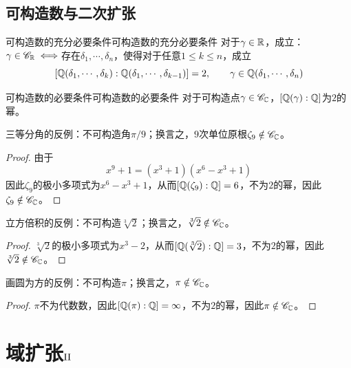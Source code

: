 \subsection{可构造数与二次扩张}

\begin{theorem}{可构造数的充分必要条件}{可构造数的充分必要条件}
	对于$\gamma\in\mathbb{R}$，成立：$\gamma\in\mathscr{C}_{\mathbb{R}}\iff$存在$\delta_1,\cdots,\delta_n$，使得对于任意$1\le k \le n$，成立%
	$$
	[\mathbb{Q}(\delta_1,\cdots,\delta_k):\mathbb{Q}(\delta_1,\cdots,\delta_{k-1})]=2,\qquad 
	\gamma\in \mathbb{Q}(\delta_1,\cdots,\delta_n)
	$$
\end{theorem}

\begin{theorem}{可构造数的必要条件}{可构造数的必要条件}
	对于可构造点$\gamma\in\mathscr{C}_{\mathbb{C}}$，$[\mathbb{Q}(\gamma):\mathbb{Q}]$为$2$的幂。
\end{theorem}

\begin{corollary}
	三等分角的反例：不可构造角$\pi/9$；换言之，$9$次单位原根$\zeta_9\notin \mathscr{C}_{\mathbb{C}}$。
\end{corollary}

\begin{proof}
	由于%
	$$
	x^9+1=(x^3+1)(x^6-x^3+1)
	$$
	因此$\zeta_9$的极小多项式为$x^6-x^3+1$，从而$[\mathbb{Q}(\zeta_9):\mathbb{Q}]=6$，不为$2$的幂，因此$\zeta_9\notin \mathscr{C}_{\mathbb{C}}$。
\end{proof}

\begin{corollary}
	立方倍积的反例：不可构造$\sqrt[3]{2}$；换言之，$\sqrt[3]{2}\notin \mathscr{C}_{\mathbb{C}}$。
\end{corollary}

\begin{proof}
	$\sqrt[3]{2}$的极小多项式为$x^3-2$，从而$[\mathbb{Q}(\sqrt[3]{2}):\mathbb{Q}]=3$，不为$2$的幂，因此$\sqrt[3]{2}\notin \mathscr{C}_{\mathbb{C}}$。
\end{proof}

\begin{corollary}
	画圆为方的反例：不可构造$\pi$；换言之，$\pi\notin \mathscr{C}_{\mathbb{C}}$。
\end{corollary}

\begin{proof}
	$\pi$不为代数数，因此$[\mathbb{Q}(\pi):\mathbb{Q}]=\infty$，不为$2$的幂，因此$\pi\notin \mathscr{C}_{\mathbb{C}}$。
\end{proof}

\section{域扩张$\rm\Rmnum{2}$}

